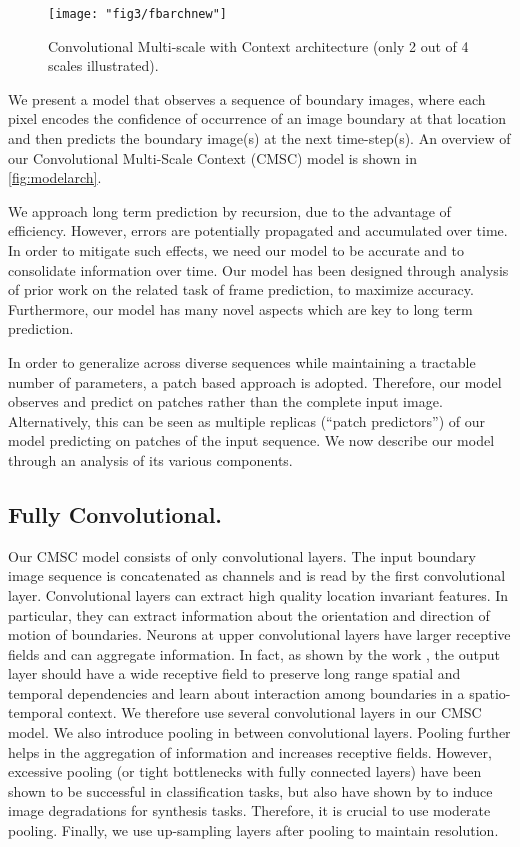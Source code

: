 \begin{figure*}[t]
    \centering
    \texttt{[image: "fig3/fbarchnew"]}    
    \caption{Convolutional Multi-scale with Context architecture (only 2 out of 4 scales illustrated).}
    \label{fig:modelarch}
\end{figure*}

We present a model that observes a sequence of boundary images, where each pixel encodes the confidence of occurrence of an image boundary at that location and then predicts the boundary image(s) at the next time-step(s). 
An overview of our Convolutional Multi-Scale Context (CMSC) model is shown in \autoref{fig:modelarch}. 

We approach long term prediction by recursion, due to the advantage of efficiency. However, errors are potentially propagated and accumulated over time. In order to mitigate such effects, we need our model to be  accurate and to consolidate information over time. Our model has been designed through analysis of prior work on the related task of frame prediction, to maximize accuracy. Furthermore, our model has many novel aspects which are key to long term prediction.

In order to generalize across diverse sequences while maintaining a tractable number of parameters, a patch based approach is adopted. Therefore, our model observes and predict on patches rather than the complete input image. Alternatively, this can be seen as multiple replicas (``patch predictors'') of our model predicting on patches of the input sequence. We now describe our model through an analysis of its various components.

\subsection{Fully Convolutional.} Our CMSC model consists of only convolutional layers. The input boundary image sequence is concatenated as channels and is read by the first convolutional layer. Convolutional layers can extract high quality location invariant features. In particular, they can extract information about the orientation and direction of motion of boundaries. Neurons at upper convolutional layers have larger receptive fields and can aggregate information. In fact, as shown by the work  \cite{jain2007supervised}, the output layer should have a wide receptive field to preserve long range spatial and temporal dependencies and learn about interaction among boundaries in a spatio-temporal context. We therefore use several convolutional layers in our CMSC model. We also introduce pooling in between convolutional layers. Pooling further helps in the aggregation of information and increases receptive fields. However, excessive pooling (or tight bottlenecks with fully connected layers) have been shown to be successful in classification tasks, but also have shown by \cite{ranzato2014video} to induce image degradations for synthesis tasks. Therefore, it is crucial to use moderate pooling. Finally, we use up-sampling layers after pooling to maintain resolution. 

